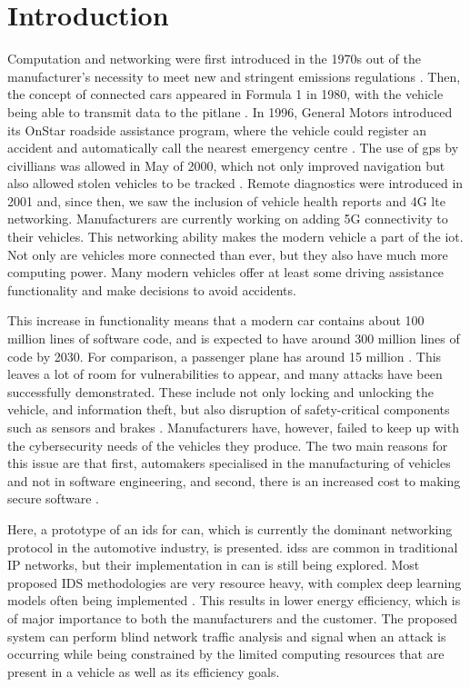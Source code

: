 \chapter{Introduction}
\label{c:intro}

Computation and networking were first introduced in the 1970s out of the manufacturer's necessity to meet new and stringent emissions regulations \citep{pelkmans2003trends}. Then, the concept of connected cars appeared in Formula 1 in 1980, with the vehicle being able to transmit data to the pitlane \citep{bmwConnectedCar}. In 1996, General Motors introduced its OnStar roadside assistance program, where the vehicle could register an accident and automatically call the nearest emergency centre \citep{sspiConnectedCar}. The use of \gls{gps} by civillians was allowed in May of 2000, which not only improved navigation but also allowed stolen vehicles to be tracked \citep{bmwConnectedCar}. Remote diagnostics were introduced in 2001 and, since then, we saw the inclusion of vehicle health reports and 4G \gls{lte} networking. Manufacturers are currently working on adding 5G connectivity to their vehicles. This networking ability makes the modern vehicle a part of the \gls{iot}. Not only are vehicles more connected than ever, but they also have much more computing power. Many modern vehicles offer at least some driving assistance functionality and make decisions to avoid accidents.\par

This increase in functionality means that a modern car contains about 100 million lines of software code, and is expected to have around 300 million lines of code by 2030. For comparison, a passenger plane has around 15 million \citep{yahooCarSecurity}. This leaves a lot of room for vulnerabilities to appear, and many attacks have been successfully demonstrated. These include not only locking and unlocking the vehicle, and information theft, but also disruption of safety-critical components such as sensors and brakes \citep{Kim2021}. Manufacturers have, however, failed to keep up with the cybersecurity needs of the vehicles they produce. The two main reasons for this issue are that first, automakers specialised in the manufacturing of vehicles and not in software engineering, and second, there is an increased cost to making secure software \citep{forbesSecurityCost}.\par

Here, a prototype of an \gls{ids} for \gls{can}, which is currently the dominant networking protocol in the automotive industry, is presented. \glspl{ids} are common in traditional IP networks, but their implementation in \gls{can} is still being explored. Most proposed IDS methodologies are very resource heavy, with complex deep learning models often being implemented \citep{ahmad2021network}. This results in lower energy efficiency, which is of major importance to both the manufacturers and the customer. The proposed system can perform blind network traffic analysis and signal when an attack is occurring while being constrained by the limited computing resources that are present in a vehicle as well as its efficiency goals.